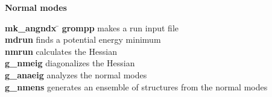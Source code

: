 \begin{description}
\item {\large\bf Normal modes}
\vspace{-2ex}\begin{tabbing}
{\bf mk\_angndx} \= \kill
{\bf grompp} \> makes a run input file \\
{\bf mdrun} \> finds a potential energy minimum \\
{\bf nmrun} \> calculates the Hessian \\
{\bf g\_nmeig} \> diagonalizes the Hessian  \\
{\bf g\_anaeig} \> analyzes the normal modes \\
{\bf g\_nmens} \> generates an ensemble of structures from the normal modes \\
\end{tabbing}\vspace{-2ex}

\end{description}

